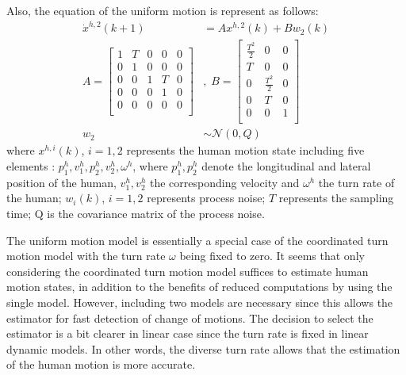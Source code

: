 \documentclass[letterpaper, 10 pt, conference]{ieeeconf}
\begin{document}
	Also, the equation of the uniform motion is represent as follows:
	\begin{subequations}
		\begin{align*}
			\dot{x}^{h,2}(k+1)&= Ax^{h,2}(k)+Bw_2(k) \label{eqn:h_d_dyn}\\
			A=\left[
			\begin{array}{ccccc}
				1& T& 0& 0& 0\\
				0& 1& 0& 0& 0\\
				0& 0& 1& T& 0\\
				0& 0& 0& 1& 0\\
				0& 0& 0& 0& 0\\
			\end{array}\right]&,\;
			B=\left[
			\begin{array}{ccc}
				\frac{T^2}{2}& 0& 0\\
				T& 0& 0\\
				0& \frac{T^2}{2}& 0\\
				0& T& 0\\
				0& 0& 1\\
			\end{array}\right] \\
			w_2&\sim\mathcal{N}(0,Q)
		\end{align*}
	\end{subequations}
	where $x^{h,i}(k)$, $i=1,2$ represents the human motion state including five elements : $p^h_1,v^h_1,p^h_2,v^h_2,\omega^h$, where $p^h_1,p^h_2$ denote the longitudinal and lateral position of the human, $v^h_1,v^h_2$ the corresponding velocity and $\omega^h$ the turn rate of the human; $w_i(k)$, $i=1,2$ represents process noise; $T$ represents the sampling time; Q is the covariance matrix of the process noise.
	
	The uniform motion model is essentially a special case of the coordinated turn motion model with the turn rate $\omega$ being fixed to zero.
	It seems that only considering the coordinated turn motion model suffices to estimate human motion states, in addition to the benefits of reduced computations by using the single model.
	However, including two models are necessary since this allows the estimator for fast detection of change of motions. 
	The decision to select the estimator is a bit clearer in linear case since the turn rate is fixed in linear dynamic models. In other words, the diverse turn rate allows that the estimation of the human motion is more accurate.
	
\end{document}
